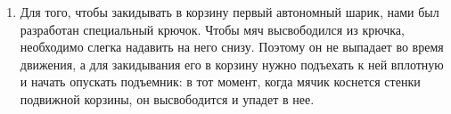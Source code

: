 \begin{enumerate}
\begin{enumerate}
		\item Для того, чтобы закидывать в корзину первый автономный шарик, нами был разработан специальный крючок. Чтобы мяч высвободился из крючка, необходимо слегка надавить на него снизу. Поэтому он не выпадает во время движения, а для закидывания его в корзину нужно подъехать к ней вплотную и начать опускать подъемник: в тот момент, когда мячик коснется стенки подвижной корзины, он высвободится и упадет в нее.
        \begin{figure}[H]
	  	  \begin{minipage}[h]{0.22\linewidth}
	  	  \end{minipage}
	  	  \hfill
	  	  \begin{minipage}[h]{0.26\linewidth}

\end{minipage}
\end{figure}
\end{enumerate}
\end{enumerate}
